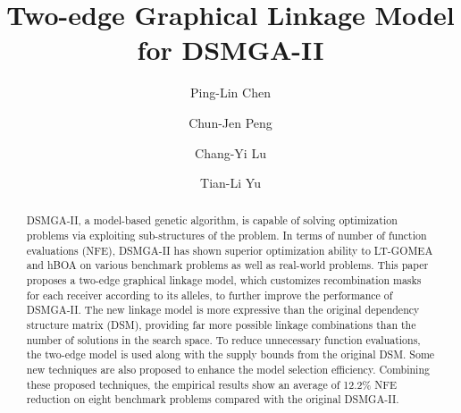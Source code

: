 \documentclass[sigconf]{acmart}
\begin{document}
\title{Two-edge Graphical Linkage Model for DSMGA-II}



\author{Ping-Lin Chen}

\author{Chun-Jen Peng}%

\author{Chang-Yi Lu}

\author{Tian-Li Yu}



\renewcommand{\shortauthors}{Chen et. al.}


\begin{abstract}

DSMGA-II, a model-based genetic algorithm, is capable of solving optimization problems via exploiting sub-structures of the problem. 
In terms of number of function evaluations (NFE), DSMGA-II has shown superior optimization ability to LT-GOMEA and hBOA on various benchmark problems as well as real-world problems. 
This paper proposes a two-edge graphical linkage model, which customizes recombination masks for each receiver according to its alleles, to further improve the performance of DSMGA-II.  
The new linkage model is more expressive than the original dependency structure matrix (DSM), providing far more possible linkage combinations than the number of solutions in the search space. 
To reduce unnecessary function evaluations, the two-edge model is used along with the supply bounds from the original DSM. 
Some new techniques are also proposed to enhance the model selection efficiency. 
Combining these proposed techniques, the empirical results show an average of 12.2\% NFE reduction on eight benchmark problems compared with the original DSMGA-II.
\end{abstract}
\end{document}
